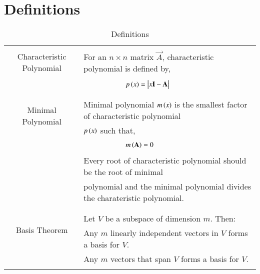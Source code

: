 \documentclass[journal,12pt]{IEEEtran}
\begin{document}
\section{\textbf{Definitions}}
\renewcommand{\thetable}{1}
\begin{table}[ht!]
\centering
\begin{tabular}{|c|l|}
    \hline
	\multirow{3}{*}{Characteristic Polynomial} 
	& \\
	& For an $n\times n$ matrix $\vec{A}$, characteristic polynomial is defined by,\\
	&\\
	& $\qquad\qquad\qquad p\brak{x}=\mydet{x\Vec{I}-\Vec{A}}$\\
	&\\
	\hline
	\multirow{3}{*}{Minimal Polynomial} 
	&\\
	& Minimal polynomial $m\left(x\right)$ is the smallest factor of characteristic polynomial\\
	& $p\left(x\right)$ such that,\\
	&\\
	& $\qquad \qquad \qquad m\left(\mathbf{A}\right)=0$\\
	& \\
	& Every root of characteristic polynomial should be the root of minimal\\
	& polynomial and the minimal polynomial divides the charateristic polynomial.\\
	&\\
	\hline
	\multirow{3}{*}{Basis Theorem} 
	&\\
	& Let $V$ be a subspace of dimension $m$. Then:\\
	& Any $m$ linearly independent vectors in $V$ forms a basis for $V$.\\
	& Any $m$ vectors that span $V$ forms a basis for $V$.\\
	&\\
    \hline
\end{tabular}
\label{table:1}
    \caption{Definitions}
\end{table}
\newpage
\end{document}
